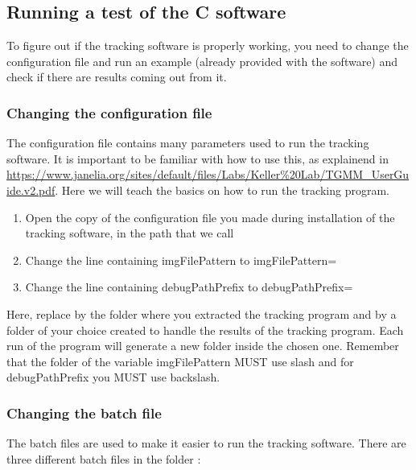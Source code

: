 \documentclass[12pt]{article}
\begin{document}
\subsection{Running a test of the C software}

To figure out if the tracking software is properly working, you need to change the configuration file and run an example (already provided with the software) and check if there are results coming out from it.

\subsubsection{Changing the configuration file}

The configuration file contains many parameters used to run the tracking software. It is important to be familiar with how to use this, as explainend in \url{https://www.janelia.org/sites/default/files/Labs/Keller%20Lab/TGMM_UserGuide.v2.pdf}. Here we will teach the basics on how to run the tracking program.

\begin{enumerate}
\item{Open the copy of the configuration file you made during installation of the tracking software, in the path that we call }
\item{Change the line containing imgFilePattern to imgFilePattern=}
\item{Change the line containing debugPathPrefix to debugPathPrefix=}
\end{enumerate}

Here, replace  by the folder where you extracted the tracking program and  by a folder of your choice created to handle the results of the tracking program. Each run of the program will generate a new folder inside the chosen one. Remember that the folder of the variable imgFilePattern MUST use slash and for debugPathPrefix you MUST use backslash.

\subsubsection{Changing the batch file}

The batch files are used to make it easier to run the tracking software. There are three different batch files in the folder :
\end{document}
